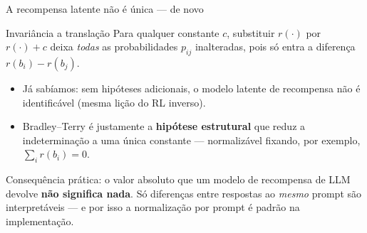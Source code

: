 \documentclass[aspectratio=169, 11pt]{beamer}
\begin{document}
\begin{frame}{A recompensa latente não é única --- de novo}

  \begin{teobox}{Invariância a translação}
    Para qualquer constante $c$, substituir $r(\cdot)$ por $r(\cdot) + c$ deixa
    \emph{todas} as probabilidades $p_{ij}$ inalteradas, pois só entra a
    diferença $r(b_i) - r(b_j)$.
  \end{teobox}

  \begin{itemize}\setlength{\itemsep}{0.3ex}
    \item Já sabíamos: sem hipóteses adicionais, o modelo latente de recompensa
      não é identificável (mesma lição do RL inverso).
    \item Bradley--Terry é justamente a \textbf{hipótese estrutural} que reduz a
      indeterminação a uma única constante --- normalizável fixando, por
      exemplo, $\sum_i r(b_i) = 0$.
  \end{itemize}

  \begin{alertabox}
    Consequência prática: o valor absoluto que um modelo de recompensa de LLM
    devolve \textbf{não significa nada}. Só diferenças entre respostas ao
    \emph{mesmo} prompt são interpretáveis --- e por isso a normalização por
    prompt é padrão na implementação.
  \end{alertabox}
\end{frame}
\end{document}
